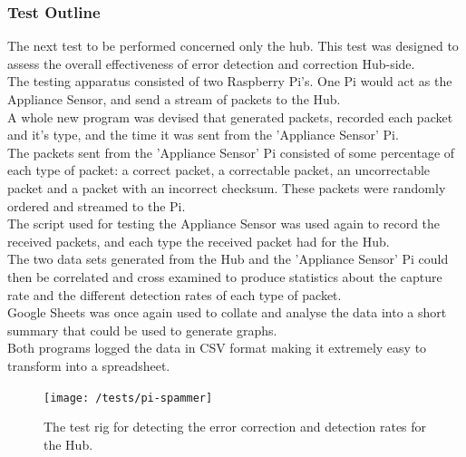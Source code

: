 \documentclass[draft,preprint,12pt,3p]{elsarticle}
\begin{document}
\subsubsection{Test Outline}
The next test to be performed concerned only the hub. This test was designed to assess the overall effectiveness of error detection and correction Hub-side.\\
The testing apparatus consisted of two Raspberry Pi's. One Pi would act as the Appliance Sensor, and send a stream of packets to the Hub.\\ 
A whole new program was devised that generated packets, recorded each packet and it's type, and the time it was sent from the 'Appliance Sensor' Pi.\\
The packets sent from the 'Appliance Sensor' Pi consisted of some percentage of each type of packet: a correct packet, a correctable packet, an uncorrectable packet and a packet with an incorrect checksum. These packets were randomly ordered and streamed to the Pi.\\
The script used for testing the Appliance Sensor was used again to record the received packets, and each type the received packet had for the Hub.\\
The two data sets generated from the Hub and the 'Appliance Sensor' Pi could then be correlated and cross examined to produce statistics about the capture rate and the different detection rates of each type of packet.\\
Google Sheets was once again used to collate and analyse the data into a short summary that could be used to generate graphs.\\
Both programs logged the data in CSV format making it extremely easy to transform into a spreadsheet.

\begin{figure}[H]
\centering
\texttt{[image: /tests/pi-spammer]}
\caption{The test rig for detecting the error correction and detection rates for the Hub.}
\label{fig:pi-spammer}
\end{figure}
\end{document}
